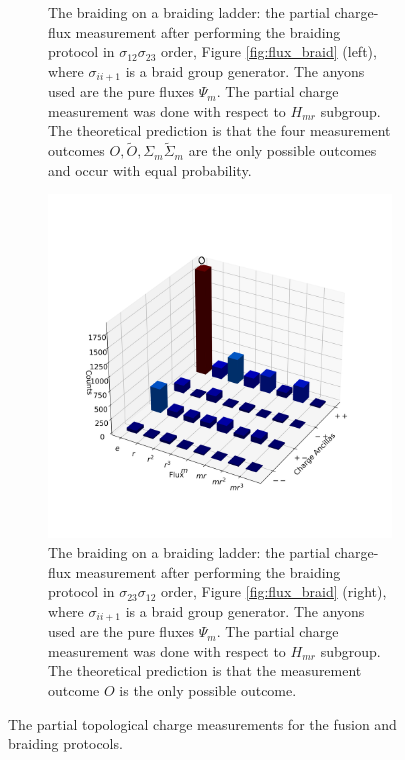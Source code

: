 \documentclass[two column]{article}
\begin{document}
\begin{figure}
\begin{subfigure}{0.47\textwidth}
    \caption{The braiding on a braiding ladder: the partial charge-flux measurement after performing the braiding protocol in $\sigma_{12}\sigma_{23}$ order, Figure \ref{fig:flux_braid} (left), where $\sigma_{ii+1}$ is a braid group generator. The anyons used are the pure fluxes $\Psi_m$. The partial charge measurement was done with respect to $H_{mr}$ subgroup. The theoretical prediction is that the four measurement outcomes $O,\tilde O,\Sigma_m \tilde{\Sigma}_m$ are the only possible outcomes and occur with equal probability.} 
    \label{fig:braid_fuse}
\end{subfigure}\hfill
\begin{subfigure}{0.47\textwidth}
    \includegraphics[width=\linewidth]{Figures/braid_link.png}
    \caption{The braiding on a braiding ladder: the partial charge-flux measurement after performing the braiding protocol in $\sigma_{23}\sigma_{12}$ order, Figure \ref{fig:flux_braid} (right), where $\sigma_{ii+1}$ is a braid group generator. The anyons used are the pure fluxes $\Psi_m$. The partial charge measurement was done with respect to $H_{mr}$ subgroup. The theoretical prediction is that the measurement outcome $O$ is the only possible outcome.}
    \label{fig:braid_link}
\end{subfigure}
\caption{The partial topological charge measurements for the fusion and braiding protocols.}
\label{fig:red_charge_res}
\end{figure}
\end{document}
